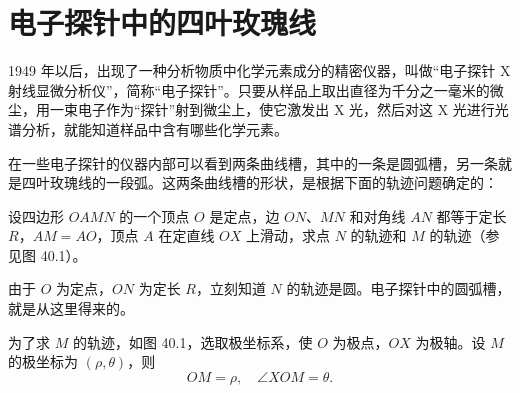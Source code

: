 \section{电子探针中的四叶玫瑰线}

1949 年以后，出现了一种分析物质中化学元素成分的精密仪器，叫做“电子探针 X 射线显微分析仪”，简称“电子探针”。只要从样品上取出直径为千分之一毫米的微尘，用一束电子作为“探针”射到微尘上，使它激发出 X 光，然后对这 X 光进行光谱分析，就能知道样品中含有哪些化学元素。

在一些电子探针的仪器内部可以看到两条曲线槽，其中的一条是圆弧槽，另一条就是四叶玫瑰线的一段弧。这两条曲线槽的形状，是根据下面的轨迹问题确定的：

设四边形 $OAMN$ 的一个顶点 $O$ 是定点，边 $ON$、$MN$ 和对角线 $AN$ 都等于定长 $R$，$AM=AO$，顶点 $A$ 在定直线 $OX$ 上滑动，求点 $N$ 的轨迹和 $M$ 的轨迹（参见图 40.1）。

由于 $O$ 为定点，$ON$ 为定长 $R$，立刻知道 $N$ 的轨迹是圆。电子探针中的圆弧槽，就是从这里得来的。

为了求 $M$ 的轨迹，如图 40.1，选取极坐标系，使 $O$ 为极点，$OX$ 为极轴。设 $M$ 的极坐标为 $(\rho, \theta)$，则
\[
  OM = \rho,\quad \angle XOM = \theta.
\]


